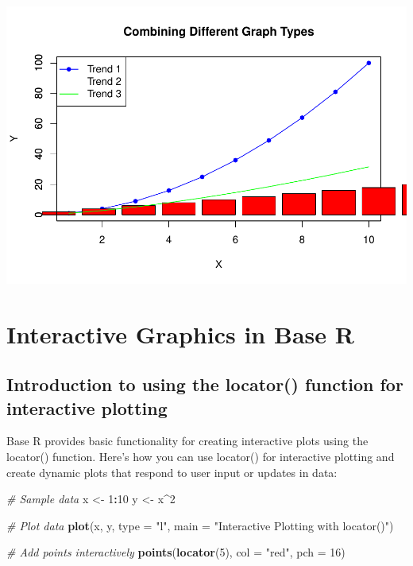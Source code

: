 \documentclass[
]{book}
\newenvironment{Shaded}{\begin{snugshade}}{\end{snugshade}}
\newcommand{\AttributeTok}[1]{\textcolor[rgb]{0.13,0.29,0.53}{#1}}
\newcommand{\CommentTok}[1]{\textcolor[rgb]{0.56,0.35,0.01}{\textit{#1}}}
\newcommand{\DecValTok}[1]{\textcolor[rgb]{0.00,0.00,0.81}{#1}}
\newcommand{\FunctionTok}[1]{\textcolor[rgb]{0.13,0.29,0.53}{\textbf{#1}}}
\newcommand{\NormalTok}[1]{#1}
\newcommand{\OtherTok}[1]{\textcolor[rgb]{0.56,0.35,0.01}{#1}}
\newcommand{\SpecialCharTok}[1]{\textcolor[rgb]{0.81,0.36,0.00}{\textbf{#1}}}
\newcommand{\StringTok}[1]{\textcolor[rgb]{0.31,0.60,0.02}{#1}}
\begin{document}
\includegraphics{_main_files/figure-latex/unnamed-chunk-54-1.pdf}

\section{Interactive Graphics in Base R}\label{interactive-graphics-in-base-r}

\subsection{Introduction to using the locator() function for interactive plotting}\label{introduction-to-using-the-locator-function-for-interactive-plotting}

Base R provides basic functionality for creating interactive plots using the locator() function. Here's how you can use locator() for interactive plotting and create dynamic plots that respond to user input or updates in data:

\begin{Shaded}
\begin{Highlighting}[]
\CommentTok{\# Sample data}
\NormalTok{x }\OtherTok{\textless{}{-}} \DecValTok{1}\SpecialCharTok{:}\DecValTok{10}
\NormalTok{y }\OtherTok{\textless{}{-}}\NormalTok{ x}\SpecialCharTok{\^{}}\DecValTok{2}

\CommentTok{\# Plot data}
\FunctionTok{plot}\NormalTok{(x, y, }\AttributeTok{type =} \StringTok{"l"}\NormalTok{, }\AttributeTok{main =} \StringTok{"Interactive Plotting with locator()"}\NormalTok{)}

\CommentTok{\# Add points interactively}
\FunctionTok{points}\NormalTok{(}\FunctionTok{locator}\NormalTok{(}\DecValTok{5}\NormalTok{), }\AttributeTok{col =} \StringTok{"red"}\NormalTok{, }\AttributeTok{pch =} \DecValTok{16}\NormalTok{)}
\end{Highlighting}
\end{Shaded}
\end{document}
